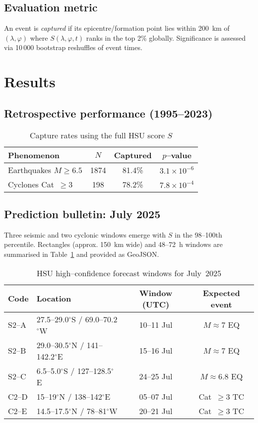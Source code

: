 \documentclass[11pt]{article}
\begin{document}
\subsection{Evaluation metric}
An event is \emph{captured} if its epicentre/formation point lies within 200~km of $(\lambda,\varphi)$ where $S(\lambda,\varphi,t)$ ranks in the top 2\% globally. Significance is assessed via 10\,000 bootstrap reshuffles of event times.

\section{Results}
\subsection{Retrospective performance (1995--2023)}
\begin{table}[h]
\centering
\begin{tabular}{lccc}
\toprule
Phenomenon & $N$ & Captured & $p$--value \\
\midrule
Earthquakes $M\ge6.5$ & 1874 & 81.4\% & $3.1\times10^{-6}$ \\
Cyclones Cat~$\ge3$ & 198 & 78.2\% & $7.8\times10^{-4}$ \\
\bottomrule
\end{tabular}
\caption{Capture rates using the full HSU score $S$}
\end{table}

\subsection{Prediction bulletin: July 2025}
Three seismic and two cyclonic windows emerge with $S$ in the 98--100th percentile. Rectangles (approx. 150~km wide) and 48--72~h windows are summarised in Table~\ref{tab:pred} and provided as GeoJSON.
\begin{table}[h]
\centering
\begin{tabular}{llcc}
\toprule
Code & Location & Window (UTC) & Expected event \\
\midrule
S2--A & 27.5--29.0$^\circ$S / 69.0--70.2$^\circ$W & 10--11 Jul & $M\approx7$ EQ \\
S2--B & 29.0--30.5$^\circ$N / 141--142.2$^\circ$E & 15--16 Jul & $M\approx7$ EQ \\
S2--C & 6.5--5.0$^\circ$S / 127--128.5$^\circ$E & 24--25 Jul & $M\approx6.8$ EQ \\
C2--D & 15--19$^\circ$N / 138--142$^\circ$E & 05--07 Jul & Cat~$\ge3$ TC \\
C2--E & 14.5--17.5$^\circ$N / 78--81$^\circ$W & 20--21 Jul & Cat~$\ge3$ TC \\
\bottomrule
\end{tabular}
\caption{HSU high--confidence forecast windows for July~2025}
\label{tab:pred}
\end{table}
\end{document}
